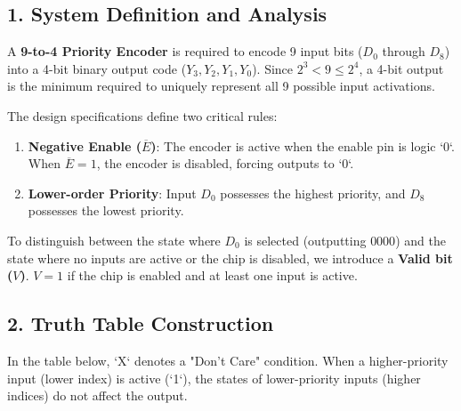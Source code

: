 \documentclass[12pt,a3paper]{article}
\begin{document}
\begin{enumerate}
\begin{tcolorbox}[enhanced,breakable,ansbox,colback=cD!4,colframe=cD,boxrule=0.8pt,arc=5pt,title={\textbf{Answer}},fonttitle=\bfseries\color{white},colbacktitle=cD]
\subsection*{1. System Definition and Analysis}

A \textbf{9-to-4 Priority Encoder} is required to encode 9 input bits ($D_0$ through $D_8$) into a 4-bit binary output code ($Y_3, Y_2, Y_1, Y_0$). Since $2^3 < 9 \le 2^4$, a 4-bit output is the minimum required to uniquely represent all 9 possible input activations.

The design specifications define two critical rules:
\begin{enumerate}
    \item \textbf{Negative Enable ($\overline{E}$)}: The encoder is active when the enable pin is logic `0`. When $\overline{E} = 1$, the encoder is disabled, forcing outputs to `0`.
    \item \textbf{Lower-order Priority}: Input $D_0$ possesses the highest priority, and $D_8$ possesses the lowest priority.
\end{enumerate}

To distinguish between the state where $D_0$ is selected (outputting $0000$) and the state where no inputs are active or the chip is disabled, we introduce a \textbf{Valid bit ($V$)}. $V = 1$ if the chip is enabled and at least one input is active.

\subsection*{2. Truth Table Construction}

In the table below, `X` denotes a "Don't Care" condition. When a higher-priority input (lower index) is active (`1`), the states of lower-priority inputs (higher indices) do not affect the output.


\end{tcolorbox}
\end{enumerate}
\end{document}
